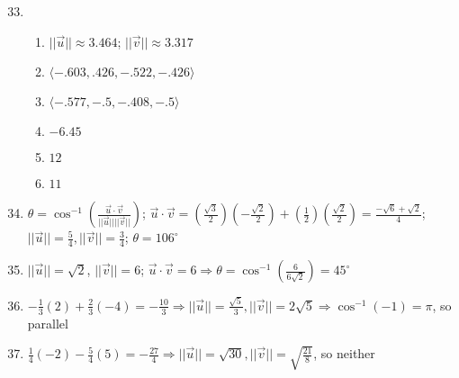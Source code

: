 \documentclass[12pt]{article}
\begin{document}
\begin{enumerate}
    \setcounter{enumi}{32}

  \item

    \begin{enumerate}

      \item $||\overrightarrow{u}||\approx3.464$; $||\overrightarrow{v}||\approx3.317$

      \item $\langle-.603,.426,-.522,-.426\rangle$

      \item $\langle-.577,-.5,-.408,-.5\rangle$

      \item $-6.45$

      \item $12$

      \item $11$

    \end{enumerate}

    \setcounter{enumi}{40}

  \item $\theta=\cos^{-1}\left( \frac{\overrightarrow{u}\cdot\overrightarrow{v}}{||\overrightarrow{u}||||\overrightarrow{v}||} \right)$; $\overrightarrow{u}\cdot\overrightarrow{v}=\left( \frac{\sqrt{3}}{2} \right)\left( -\frac{\sqrt{2}}{2} \right)+\left( \frac{1}{2} \right)\left( \frac{\sqrt{2}}{2} \right)=\frac{-\sqrt{6}+\sqrt{2}}{4}$; $||\overrightarrow{u}||=\frac{5}{4}, ||\overrightarrow{v}||=\frac{3}{4}$; $\theta=106^{\circ}$

    \setcounter{enumi}{44}

  \item $||\overrightarrow{u}||=\sqrt{2}$, $||\overrightarrow{v}||=6$; $\overrightarrow{u}\cdot\overrightarrow{v}=6\Rightarrow\theta=\cos^{-1}\left( \frac{6}{6\sqrt{2}} \right)=45^{\circ}$

    \setcounter{enumi}{48}

  \item $-\frac{1}{3}(2)+\frac{2}{3}(-4)=-\frac{10}{3}\Rightarrow ||\overrightarrow{u}||=\frac{\sqrt{5}}{3}, ||\overrightarrow{v}||=2\sqrt{5}\Rightarrow\cos^{-1}(-1)=\pi$, so parallel

    \setcounter{enumi}{52}

  \item $\frac{1}{4}(-2)-\frac{5}{4}(5)=-\frac{27}{4}\Rightarrow ||\overrightarrow{u}||=\sqrt{30}, ||\overrightarrow{v}||=\sqrt{\frac{21}{8}}$, so neither


\end{enumerate}
\end{document}
